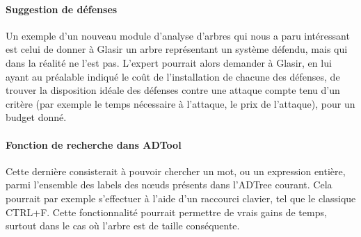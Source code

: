 \paragraph{Suggestion de défenses} Un exemple d'un nouveau module d'analyse d'arbres qui nous a paru intéressant est celui de donner à Glasir un arbre représentant un système défendu, mais qui dans la réalité ne l'est pas. L'expert pourrait alors demander à Glasir, en lui ayant au préalable indiqué le coût de l'installation de chacune des défenses, de trouver la disposition idéale des défenses contre une attaque compte tenu d'un critère (par exemple le temps nécessaire à l'attaque, le prix de l'attaque), pour un budget donné.

\paragraph{Fonction de recherche dans ADTool} Cette dernière consisterait à pouvoir chercher un mot, ou un expression entière, parmi l'ensemble des labels des n\oe{}uds présents dans l'ADTree courant. Cela pourrait par exemple s'effectuer à l'aide d'un raccourci clavier, tel que le classique {\sc CTRL+F}. Cette fonctionnalité pourrait permettre de vrais gains de temps, surtout dans le cas où l'arbre est de taille conséquente.